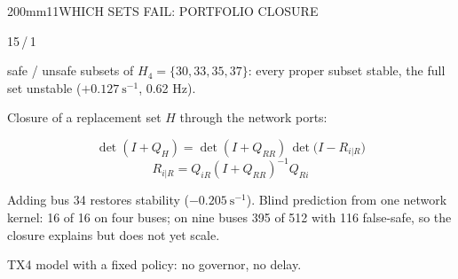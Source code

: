 \begin{DensePanel}{200mm}{11}{WHICH SETS FAIL: PORTFOLIO CLOSURE}
  \noindent\begin{minipage}[t]{112mm}\vspace{0pt}
    {\DenseBig\color{IASVermillion}15\,/\,1\par}
    {\DenseSmall\raggedright safe / unsafe subsets of $H_4=\{30,33,35,37\}$: every proper subset stable, the full set unstable ($+0.127\ \mathrm{s^{-1}}$, 0.62 Hz).\par}
  \end{minipage}\hfill%
  \begin{minipage}[t]{160mm}\vspace{0pt}
    {\DenseSmall Closure of a replacement set $H$ through the network ports:\par}
    {\fontsize{25pt}{30pt}\selectfont\color{IASBlue}\[
      \det(I+Q_H)=\det(I+Q_{RR})\,\det\!\big(I-R_{i|R}\big)
    \]}
    \vspace{-3mm}
    {\fontsize{25pt}{30pt}\selectfont\color{IASBlue}\[
      R_{i|R}=Q_{iR}(I+Q_{RR})^{-1}Q_{Ri}
    \]}
  \end{minipage}\par
  \vspace{1mm}
  {\DenseSmall Adding bus 34 restores stability ($-0.205\ \mathrm{s^{-1}}$). Blind prediction from one network kernel: 16 of 16 on four buses; on nine buses 395 of 512 with 116 false-safe, so the closure explains but does not yet scale.\par}
  \vspace{1mm}
  {\DenseSmall\color{IASGray} TX4 model with a fixed policy: no governor, no delay.\par}
\end{DensePanel}

